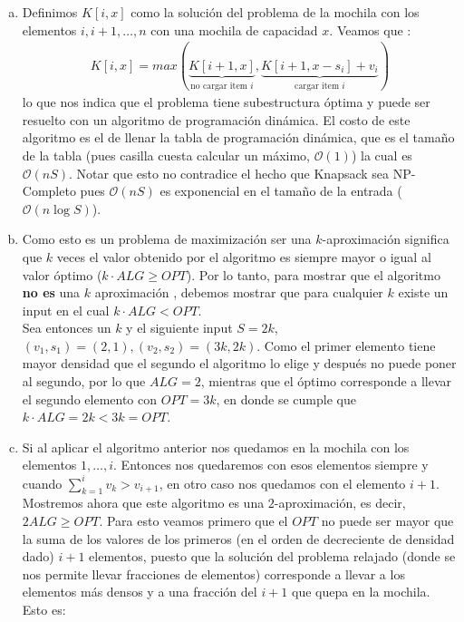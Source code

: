 \documentclass[dcc,uchile]{fcfmcourse}
\begin{document}
\begin{problems}
\item 
\begin{enumerate}[a)]
\item Definimos $K[i,x]$ como la solución del problema de la mochila con los elementos $i, i+1, \ldots, n$ con una mochila de capacidad $x$.
Veamos que :
\begin{align*}
    K[i,x] = max(\underbrace{K[i+1,x]}_{\text{no cargar item $i$}}, \underbrace{K[i+1, x-s_{i}] + v_{i}}_{\text{cargar item $i$}})
\end{align*}
lo que nos indica que el problema tiene subestructura óptima y puede ser resuelto con un algoritmo de programación dinámica. El costo de este algoritmo es el de llenar la tabla de programación dinámica, que es el tamaño de la tabla (pues casilla cuesta calcular un máximo, $\mathcal{O}(1)$) la cual es $\mathcal{O}(nS)$. Notar que esto no contradice el hecho que Knapsack sea NP-Completo pues $\mathcal{O}(nS)$ es exponencial en el tamaño de la entrada ($\mathcal{O}(n\log S)$).
\item Como esto es un problema de maximización ser una $k$-aproximación significa que $k$ veces el valor obtenido por el algoritmo es siempre mayor o igual al valor óptimo ($k\cdot ALG \ge OPT$). Por lo tanto, para mostrar que el algoritmo \textbf{no es} una $k$ aproximación , debemos mostrar que para cualquier $k$ existe un input en el cual $k\cdot ALG < OPT$.\\
Sea entonces un $k$ y el siguiente input $S = 2k$, $(v_{1},s_{1}) = (2, 1), (v_{2},s_{2}) = (3k, 2k)$. Como el primer elemento tiene mayor densidad que el segundo el algoritmo lo elige y después no puede poner al segundo, por lo que $ALG = 2$, mientras que el óptimo corresponde a llevar el segundo elemento con $OPT = 3k$, en donde se cumple que $k\cdot ALG = 2k < 3k = OPT$.
\item Si al aplicar el algoritmo anterior nos quedamos en la mochila con los elementos $1, \ldots, i$. Entonces nos quedaremos con esos elementos siempre y cuando $\sum_{k=1}^i v_{k} > v_{i+1}$, en otro caso nos quedamos con el elemento $i+1$.\\
Mostremos ahora que este algoritmo es una $2$-aproximación, es decir, $2ALG \ge OPT$. Para esto veamos primero que el $OPT$ no puede ser mayor que la suma de los valores de los primeros (en el orden de decreciente de densidad dado) $i+1$ elementos, puesto que la solución del problema relajado (donde se nos permite llevar fracciones de elementos) corresponde a llevar a los elementos más densos y a una fracción del $i+1$ que quepa en la mochila. Esto es:

\end{enumerate}
\end{problems}
\end{document}
